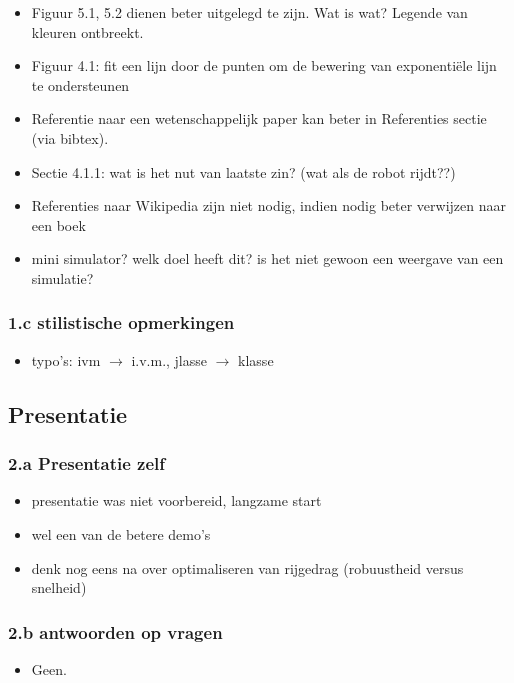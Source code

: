 \documentclass[12pt,a4paper]{report}
\begin{document}
 
\begin{itemize}
 \item Figuur 5.1, 5.2 dienen beter uitgelegd te zijn. Wat is wat? Legende van kleuren ontbreekt. 
 \item Figuur 4.1: fit een lijn door de punten om de bewering van exponenti\"ele lijn te ondersteunen 
 \item Referentie naar een wetenschappelijk paper kan beter in Referenties sectie (via bibtex).
 \item Sectie 4.1.1: wat is het nut van laatste zin? (wat als de robot rijdt??)
 \item Referenties naar Wikipedia zijn niet nodig, indien nodig beter verwijzen naar een boek
 \item mini simulator? welk doel heeft dit? is het niet gewoon een weergave van een simulatie?
\end{itemize}

   \subsubsection{1.c stilistische opmerkingen}

\begin{itemize}
	\item typo's: ivm $\rightarrow$ i.v.m., jlasse $\rightarrow$ klasse
\end{itemize}

\subsection{Presentatie}

	\subsubsection{2.a Presentatie zelf}
\begin{itemize}
 \item presentatie was niet voorbereid, langzame start
 \item wel een van de betere demo's
 \item denk nog eens na over optimaliseren van rijgedrag (robuustheid versus snelheid)
\end{itemize}

     \subsubsection{2.b antwoorden op vragen}
\begin{itemize}
	\item     Geen.
 
\end{itemize}
\end{document}
